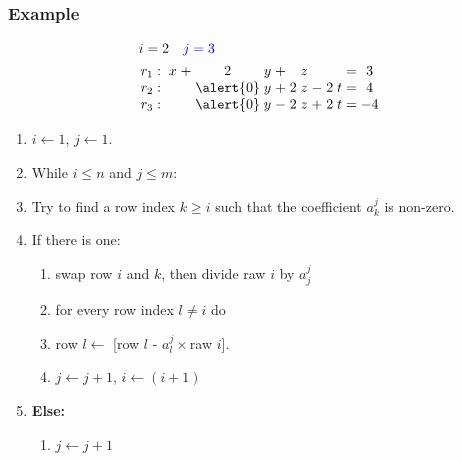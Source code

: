 \documentclass{beamer}
\begin{document}
\begin{frame}
  \frametitle{Example}
  
  \[\arraycolsep=1.4pt
  \begin{aligned}
    &i = 2 \quad {\color{blue}j = 3} \\
      &
    \begin{array}{lcccccccccccccc}
        r_1  & : &  & x & + & 2 & y & + &  & z &  & & & = & 3\\
        r_2 & : &   &   &  &  \alert{0} & y & + & 2 & z & - & 2 & t  & = & 4\\
        r_3  & : &  &   &  & \alert{0}  & y  & - & 2 & z & + & 2 & t & = & -4\\
    \end{array}
  \end{aligned}
  \]
  
  
  \begin{enumerate}
  \item $i \leftarrow 1$, $j \leftarrow 1$.
  \item While $i \le n$ and $j \le m$:
  \item Try to find a row index $k \ge i$ such that the coefficient $a^j_k$ is non-zero.
  \item If there is one:
    \begin{enumerate}
    \item swap row $i$ and $k$, then divide raw $i$ by $a^{j}_j$
    \item for every row index $l \neq i$ do 
    \item row $l \leftarrow$ [row $l$ - $a^j_l\times$raw $i$].
    \item $j \leftarrow j+1$, $i \leftarrow (i+1)$
    \end{enumerate}
  \item {\bf Else:}
    \begin{enumerate}
    \item $j \leftarrow j+1$
    \end{enumerate}
  \end{enumerate}
  
\end{frame}
\end{document}
